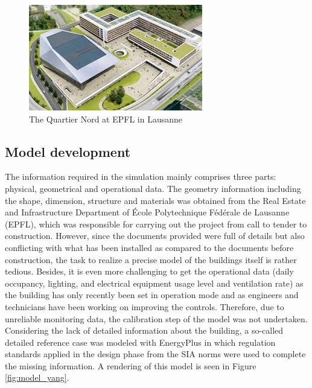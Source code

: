 \documentclass{tBPS2e}
\theoremstyle{plain}
\theoremstyle{definition}
\theoremstyle{remark}
\newcommand{\noteDT}[1]{\footnote{\textcolor{green}{#1}}}
\begin{document}
\begin{figure}[H]
\centering
\includegraphics[]{figures/quartier_nord_1}
\caption{The Quartier Nord at EPFL in Lausanne}
\label{fig:quartier_nord_1}
\end{figure}



\subsection{Model development}
The information required in the simulation mainly comprises three parts:
physical, geometrical and operational data. The geometry information including
the shape, dimension, structure and materials was obtained from the Real
Estate and Infrastructure Department of École Polytechnique Fédérale de
Lausanne (EPFL), which was responsible for carrying out the project from call
to tender to construction. However, since the documents provided were full of
details but also conflicting with what has been installed as compared to the
documents before construction, the task to realize a precise model of the
buildings itself is rather tedious. Besides, it is even more challenging to
get the operational data (daily occupancy, lighting, and electrical equipment
usage level and ventilation rate) as the building has only recently been set
in operation mode and as engineers and technicians have been working on
improving the controls. Therefore, due to unreliable monitoring data, the
calibration step of the model was not undertaken.\\

Considering the lack of detailed information about the building, a so-called
detailed reference case was modeled with EnergyPlus \citep{Mauree:2015to} in
which regulation standards applied in the design phase from the SIA norms were
used to complete the missing information. A rendering of this model is seen in
Figure \ref{fig:model_yang}.
\end{document}
